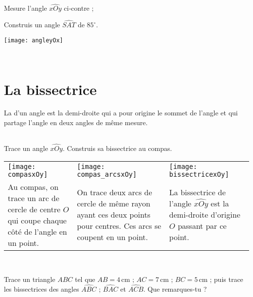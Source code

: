 \begin{methode*1}
\exercice
 \begin{enumerate}
 \begin{minipage}[c]{0.36\textwidth}
  \item Mesure l'angle $\widehat{xOy}$ ci‑contre ;
  \item Construis un angle $\widehat{SAT}$ de $85^\circ$. 
  \end{minipage} \hfill%
 \begin{minipage}[c]{0.56\textwidth}
  \texttt{[image: angleyOx]} 
  \end{minipage} \\
  \end{enumerate}
 
\end{methode*1}



\section{La bissectrice}

\begin{definition}
La \textbf{} d'un angle est la demi-droite qui a pour origine le sommet de l'angle et qui partage l'angle en deux angles de même mesure.
\end{definition}


\begin{methode*1}


\begin{exemple*1} \\[0.75em]
Trace un angle $\widehat{xOy}$. Construis sa bissectrice au compas. \\[0.5em]

\begin{tabularx}{\textwidth}{X|X|X}
 \texttt{[image: compasxOy]} &  \texttt{[image: compas\_arcsxOy]} & \texttt{[image: bissectricexOy]} \\ 
Au compas, on trace un arc de cercle de centre $O$ qui coupe chaque côté de l'angle en un point. & On trace deux arcs de cercle de même rayon ayant ces deux points pour centres. Ces arcs se coupent en un point. & La bissectrice de l'angle $\widehat{xOy}$ est la demi-droite d'origine $O$ passant par ce point. \\
\end{tabularx} \\

 \end{exemple*1}

\exercice 

Trace un triangle $ABC$ tel que $AB=4$\,cm ; $AC=7$\,cm ; $BC=5$\,cm ; puis trace les bissectrices des angles $\widehat{ABC}$ ; $\widehat{BAC}$ et $\widehat{ACB}$. Que remarques-tu ?


 
\end{methode*1}


